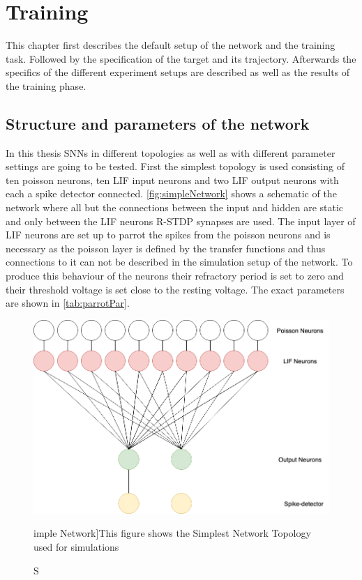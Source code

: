 
\chapter{Training}\label{chapter:Training}
This chapter first describes the default setup of the network and the training task. Followed by the specification of the target and its trajectory. Afterwards the specifics of the different experiment setups are described as well as the results of the training phase.
\section{Structure and parameters of the network}
In this thesis SNNs in different topologies as well as with different parameter settings are going to be tested. First the simplest topology is used consisting of ten poisson neurons, ten LIF input neurons and two LIF output neurons with each a spike detector connected. \autoref{fig:simpleNetwork} shows a schematic of the network where all but the connections between the input and hidden are static and only between the LIF neurons R-STDP synapses are used. The input layer of LIF neurons are set up to parrot the spikes from the poisson neurons and is necessary as the poisson layer is defined by the transfer functions and thus connections to it can not be described in the simulation setup of the network. To produce this behaviour of the neurons their refractory period is set to zero and their threshold voltage is set close to the resting voltage. The exact parameters are shown in \autoref{tab:parrotPar}.


\begin{figure}[htpb]
  \centering
  \includegraphics[width=\textwidth]{figures/plots/simpleNetwork}
  \caption Simple Network]{This figure shows the Simplest Network Topology used for simulations}
  \label{fig:simpleNetwork}
\end{figure}

